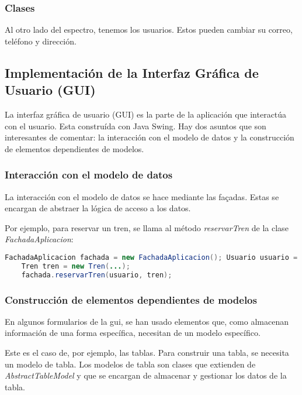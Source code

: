 \subsubsection{Clases}\label{subsubsec:clases}
Al otro lado del espectro, tenemos los usuarios.
Estos pueden cambiar su correo, teléfono y dirección.


\subsection{Implementación de la Interfaz Gráfica de Usuario (GUI)}\label{subsec:implementacion_gui}

La interfaz gráfica de usuario (GUI) es la parte de la aplicación que interactúa con el usuario.
Esta construída con Java Swing.
Hay dos asuntos que son interesantes de comentar: la interacción con el modelo de datos y la construcción de
elementos dependientes de modelos.

\subsubsection{Interacción con el modelo de datos}\label{subsubsec:interaccion_con_el_modelo_de_datos}
La interacción con el modelo de datos se hace mediante las façadas.
Estas se encargan de abstraer la lógica de acceso a los datos.

Por ejemplo, para reservar un tren, se llama al método \textit{reservarTren} de la clase \textit{FachadaAplicacion}:
\begin{lstlisting}[language=Java, caption={Interacción con el modelo de datos}, label={lst:interaccion_modelo_datos}]
    FachadaAplicacion fachada = new FachadaAplicacion(); Usuario usuario = new Usuario(...);
    Tren tren = new Tren(...);
    fachada.reservarTren(usuario, tren);
\end{lstlisting}

\subsubsection{Construcción de elementos dependientes de modelos}\label{subsubsec:construccion_de_elementos_dependientes_de_modelos}
En algunos formularios de la gui, se han usado elementos que, como almacenan información de una forma específica,
necesitan de un modelo específico.

Este es el caso de, por ejemplo, las tablas.
Para construir una tabla, se necesita un modelo de tabla.
Los modelos de tabla son clases que extienden de \textit{AbstractTableModel} y que se encargan de almacenar y gestionar los datos de la tabla.

